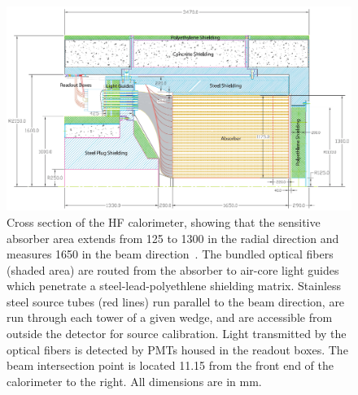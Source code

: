 \begin{figure}[htb]
   \begin{center}
      \includegraphics[width=1.\textwidth]{figures/ch_hfcalibration/HF_Calorimeter.png}
      \caption{Cross section of the HF calorimeter, showing that the sensitive absorber area extends from
      125 to 1300 in the radial direction and measures 1650 in the beam direction~\cite{HFCC:2008}. The bundled
      optical fibers (shaded area) are routed from the absorber to air-core light guides which penetrate
      a steel-lead-polyethlene shielding matrix. Stainless steel source tubes (red lines) run parallel to
      the beam direction, are run through each tower of a given wedge, and are accessible from outside the
      detector for source calibration. Light transmitted by the optical fibers is detected by PMTs housed
      in the readout boxes. The beam intersection point is located 11.15 from the front end of the
      calorimeter to the right. All dimensions are in mm.}
      \label{fig:HF_Calo}
   \end{center}
\end{figure}


